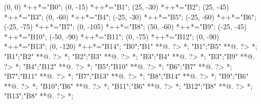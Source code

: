\begin{scriptsize}
\xy(0, 0)
	*++{}*\frm{-,}="B0";
(0, -15)
	*++{}*\frm{-,}="B1";
(25, -30)
	*++{}*\frm{-,}="B2";
(25, -45)
	*++{}*\frm{-,}="B3";
(0, -60)
	*++{}*\frm{-,}="B4";
(-25, -30)
	*++{}*\frm{-,}="B5";
(-25, -60)
	*++{}*\frm{-,}="B6";
(-25, -75)
	*++{}*\frm{-,}="B7";
(0, -105)
	*++{}*\frm{-,}="B8";
(50, -60)
	*++{}*\frm{-,}="B9";
(-25, -45)
	*++{}*\frm{-,}="B10";
(-50, -90)
	*++{}*\frm{-,}="B11";
(0, -75)
	*++{}*\frm{-,}="B12";
(0, -90)
	*++{}*\frm{-,}="B13";
(0, -120)
	*++{}*\frm{-,}="B14";
"B0";"B1" **@{.} ?> *{\dir{>}};
"B1";"B5" **@{.} ?> *{\dir{>}};
"B1";"B2" **@{.} ?> *{\dir{>}};
"B2";"B3" **@{.} ?> *{\dir{>}};
"B3";"B4" **@{.} ?> *{\dir{>}};
"B3";"B9" **@{.} ?> *{\dir{>}};
"B4";"B12" **@{.} ?> *{\dir{>}};
"B5";"B10" **@{.} ?> *{\dir{>}};
"B6";"B7" **@{.} ?> *{\dir{>}};
"B7";"B11" **@{.} ?> *{\dir{>}};
"B7";"B13" **@{.} ?> *{\dir{>}};
"B8";"B14" **@{.} ?> *{\dir{>}};
"B9";"B6" **@{.} ?> *{\dir{>}};
"B10";"B6" **@{.} ?> *{\dir{>}};
"B11";"B6" **@{.} ?> *{\dir{>}};
"B12";"B8" **@{.} ?> *{\dir{>}};
"B13";"B8" **@{.} ?> *{\dir{>}};
\endxy
\end{scriptsize}


